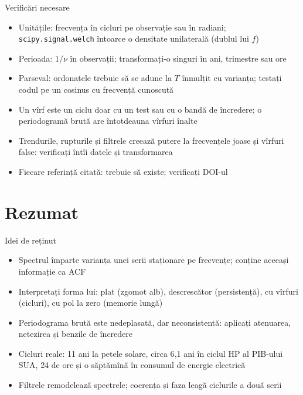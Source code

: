 \begin{frame}{Verificări necesare}
\itemsize{\small}
\begin{itemize}
    \item Unitățile: frecvența în cicluri pe observație sau în radiani; \texttt{scipy.signal.welch} întoarce o densitate unilaterală (dublul lui $f$)
    \item Perioada: $1/\nu$ în observații; transformați-o singuri în ani, trimestre sau ore
    \item Parseval: ordonatele trebuie să se adune la $T$ înmulțit cu varianța; testați codul pe un cosinus cu frecvență cunoscută
    \item Un vîrf este un ciclu doar cu un test sau cu o bandă de încredere; o periodogramă brută are întotdeauna vîrfuri înalte
    \item Trendurile, rupturile și filtrele creează putere la frecvențele joase și vîrfuri false: verificați întîi datele și transformarea
    \item Fiecare referință citată: trebuie să existe; verificați DOI-ul
\end{itemize}
\end{frame}


\section{Rezumat}

\begin{frame}{Idei de reținut}
\itemsize{\small}
\begin{itemize}
    \item Spectrul împarte varianța unei serii staționare pe frecvențe; conține aceeași informație ca ACF
    \item Interpretați forma lui: plat (zgomot alb), descrescător (persistență), cu vîrfuri (cicluri), cu pol la zero (memorie lungă)
    \item Periodograma brută este nedeplasată, dar neconsistentă: aplicați atenuarea, netezirea și benzile de încredere
    \item Cicluri reale: 11 ani la petele solare, circa 6{,}1 ani în ciclul HP al PIB-ului SUA, 24 de ore și o săptămînă în consumul de energie electrică
    \item Filtrele remodelează spectrele; coerența și faza leagă ciclurile a două serii
\end{itemize}
\end{frame}

